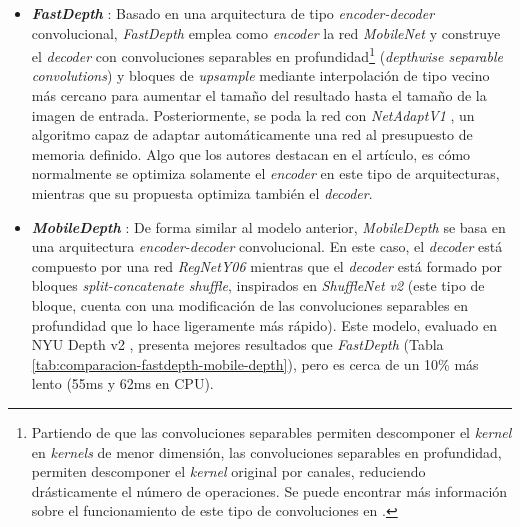 \documentclass[a4paper, 11pt]{article}
\newcommand{\textbfit}[1]{\textbf{\textit{#1}}}
\begin{document}
\begin{itemize}
    \item \textbfit{FastDepth} \cite{icra_2019_fastdepth}: Basado en una arquitectura de tipo \textit{encoder-decoder} convolucional, \textit{FastDepth} emplea como \textit{encoder} la red \textit{MobileNet} \cite{mobilenets} y construye el \textit{decoder} con convoluciones separables en profundidad\footnote{Partiendo de que las convoluciones separables permiten descomponer el \textit{kernel} en \textit{kernels}  de menor dimensión, las convoluciones separables en profundidad, permiten descomponer el \textit{kernel} original por canales, reduciendo drásticamente el número de operaciones. Se puede encontrar más información sobre el funcionamiento de este tipo de convoluciones en \cite{mobilenets}.} (\textit{depthwise separable convolutions}) y bloques de \textit{upsample} mediante interpolación de tipo vecino más cercano para aumentar el tamaño del resultado hasta el tamaño de la imagen de entrada. Posteriormente, se poda la red con \textit{NetAdaptV1} \cite{eccv_2018_yang_netadapt}, un algoritmo capaz de adaptar automáticamente una red al presupuesto de memoria definido. Algo que los autores destacan en el artículo, es cómo normalmente se optimiza solamente el \textit{encoder} en este tipo de arquitecturas, mientras que su propuesta optimiza también el \textit{decoder}.
    
    \item \textbfit{MobileDepth} \cite{wang2020mobiledepth}: De forma similar al modelo anterior, \textit{MobileDepth} se basa en una arquitectura \textit{encoder-decoder} convolucional. En este caso, el \textit{decoder} está compuesto por una red \textit{RegNetY06} \cite{regnety} mientras que el \textit{decoder} está formado por bloques \textit{split-concatenate shuffle}, inspirados en \textit{ShuffleNet v2} (este tipo de bloque, cuenta con una modificación de las convoluciones separables en profundidad que lo hace ligeramente más rápido). Este modelo, evaluado en NYU Depth v2 \cite{nyudepthv2}, presenta mejores resultados que \textit{FastDepth} (Tabla \ref{tab:comparacion-fastdepth-mobile-depth}), pero es cerca de un 10\% más lento (55ms y 62ms en CPU).
    

\end{itemize}
\end{document}
